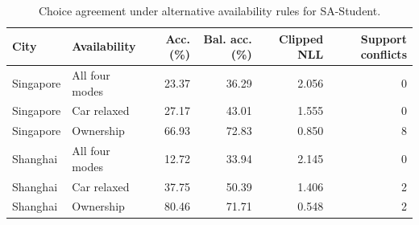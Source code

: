 \begin{table}[pos=htbp]
\centering\small
\caption{Choice agreement under alternative availability rules for SA-Student.}
\label{tab:availability}
\setlength{\tabcolsep}{3pt}
\renewcommand{\arraystretch}{1.12}
\begin{tabular*}{\linewidth}{@{\extracolsep{\fill}}llrrrr@{}}
\toprule
City & Availability & Acc. (\%) & Bal. acc. (\%) & Clipped NLL & Support conflicts \\
\midrule
Singapore & All four modes & 23.37 & 36.29 & 2.056 & 0 \\
Singapore & Car relaxed & 27.17 & 43.01 & 1.555 & 0 \\
Singapore & Ownership & 66.93 & 72.83 & 0.850 & 8 \\
Shanghai & All four modes & 12.72 & 33.94 & 2.145 & 0 \\
Shanghai & Car relaxed & 37.75 & 50.39 & 1.406 & 2 \\
Shanghai & Ownership & 80.46 & 71.71 & 0.548 & 2 \\
\bottomrule
\end{tabular*}
\par{}
\end{table}

